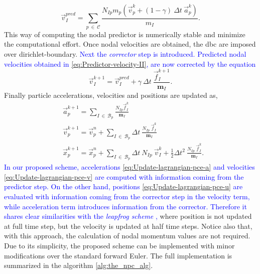 \documentclass[preprint,12pt,a4paper]{elsarticle}
\newcommand{\tens}[1]{
  \ensuremath{\mathbf{{#1}}}
}
\begin{document}
{\color{red}
\begin{equation}
  \label{eq:Predictor-velocity-II}
  \vec{v}_{I}^{pred} =  \sum_{p\ \in\ \mathcal{C}} \frac{ N_{Ip} m_p (\vec{v}_p^k + (1 - \gamma)\ \Delta t\ \vec{a}_p^k)}{m_I}.
\end{equation}
}
This way of computing the nodal predictor is numerically stable
and minimize the computational effort. Once nodal velocities are
obtained, the \acrshort{dbc} are imposed over \gls{dirichlet-boundary}. \textcolor{blue}{Next the \textit{corrector}  step is introduced. Predicted nodal velocities obtained in \eqref{eq:Predictor-velocity-II}, are now corrected by the equation}
\begin{equation}
  \label{eq:Corrector-velocity}
  \vec{v}_{I}^{k+1} = \vec{v}_{I}^{pred} + \gamma\ \Delta t\ \frac{\vec{f}_{I}^{k+1}}{\tens{m}_I}.
\end{equation}
Finally particle accelerations, velocities and positions are updated as,
\begin{align}
      \label{eq:Update-lagrangian-pce-a}    
        &\vec{a}_p^{k+1} = \sum_{I\ \in\ \mathcal{B}_p} \frac{N_{Ip}\vec{f}_{I}^{k}}{\tens{m}_I}\\
        \label{eq:Update-lagrangian-pce-v}  
      &\vec{v}_p^{k+1} = \vec{v}_p^n + \sum_{I\ \in\ \mathcal{B}_p} \Delta t\
        \frac{N_{Ip}\
        \vec{f}_{I}^{k}}{\tens{m}_I}\\
        \label{eq:Update-lagrangian-pce-u}
      &\vec{x}_p^{k+1} = \vec{x}_p^n + \sum_{I\ \in\ \mathcal{B}_p} \Delta t\
         N_{Ip}\ \vec{v}_{I}^{k} +
        \frac{1}{2}\Delta t^2\ \frac{N_{Ip}\
        \vec{f}_{I}^{k}}{\tens{m}_I}.
\end{align}
\textcolor{blue}{In our proposed scheme, accelerations \eqref{eq:Update-lagrangian-pce-a} and velocities \eqref{eq:Update-lagrangian-pce-v} are computed with information coming from the predictor step. On the other hand, positions \eqref{eq:Update-lagrangian-pce-u} are evaluated with information coming from the corrector step in the velocity term, while acceleration term introduces information from the corrector. Therefore it shares clear similarities with the \textit{leapfrog scheme} \cite{Zhang_book_2016},} where position is not updated at full time step, but the velocity is updated at half time steps. Notice also that, with this approach, the calculation of nodal momentum values are not required. Due to its simplicity, the proposed scheme can be implemented with minor modifications over the standard forward Euler. The full implementation is summarized in the algorithm \ref{alg:the_npc_alg}.
\end{document}
